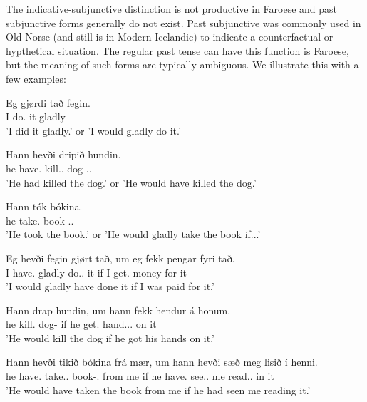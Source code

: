 \documentclass[12pt,%
]{lin-v2/lin}
\begin{document}
The indicative-subjunctive distinction is not productive in Faroese and past subjunctive forms generally do not exist.
Past subjunctive was commonly used in Old Norse (and still is in Modern Icelandic) to indicate a counterfactual or hypthetical
situation. The regular past tense can have this function is Faroese, but the meaning of such forms are typically
ambiguous. We illustrate this with a few examples:
\begin{exe}
    \ex
    \begin{xlist}
        \item \gll Eg gjørdi tað fegin.\\
        I do.\Pst{} it gladly\\
        \trans 'I did it gladly.' or 'I would gladly do it.'
        \item \gll Hann hevði dripið hundin.\\
        he have.\Pst{} kill.\Pst.\Ptcp{} dog-\Det.\Acc.\M{}\\
        \trans 'He had killed the dog.' or 'He would have killed the dog.'
        \item \gll Hann tók bókina.\\
        he take.\Pst{} book-\Det.\Nom.\F{}\\
        \trans 'He took the book.' or 'He would gladly take the book if...'
        \item \gll Eg hevði fegin gjørt tað, um eg fekk pengar fyri tað.\\
        I have.\Pst{} gladly do.\Pst.\Ptcp{} it if I get.\Pst{} money for it\\
        \trans 'I would gladly have done it if I was paid for it.'
        \item \gll Hann drap hundin, um hann fekk hendur á honum.\\
        he kill.\Pst{} dog-\Det{} if he get.\Pst{} hand.\Nom.\Pl. on it\\
        \trans 'He would kill the dog if he got his hands on it.'
        \item \gll Hann hevði tikið bókina frá mær, um hann hevði sæð meg lisið í henni.\\
        he have.\Pst{} take.\Pst.\Ptcp{} book-\Det{}.\Nom{} from me if he have.\Pst{} see.\Pst.\Ptcp{} me read.\Pst.\Ptcp{} in it\\
        \trans 'He would have taken the book from me if he had seen me reading it.'
    \end{xlist}
\end{exe}
\end{document}
